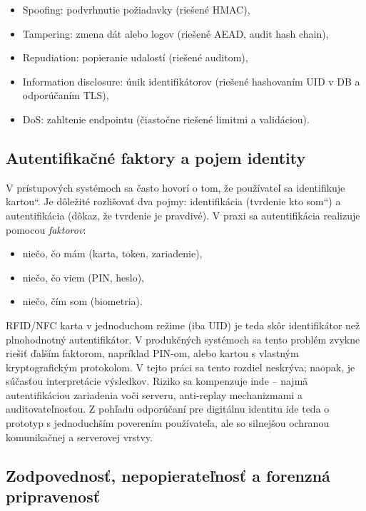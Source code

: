 \documentclass[journal,a4paper,onecolumn]{IEEEtran}
\newcommand{\uv}[1]{\quotedblbase#1\textquotedblleft}
\begin{document}
\begin{itemize}[leftmargin=*,itemsep=2pt]
  \item Spoofing: podvrhnutie požiadavky (riešené HMAC),
  \item Tampering: zmena dát alebo logov (riešené AEAD, audit hash chain),
  \item Repudiation: popieranie udalostí (riešené auditom),
  \item Information disclosure: únik identifikátorov (riešené hashovaním UID v DB a odporúčaním TLS),
  \item DoS: zahltenie endpointu (čiastočne riešené limitmi a validáciou).
\end{itemize}



\subsection{Autentifikačné faktory a pojem identity}

V prístupových systémoch sa často hovorí o tom, že používateľ sa \uv{identifikuje kartou}. Je dôležité rozlišovať dva pojmy: identifikácia (tvrdenie \uv{kto som}) a autentifikácia (dôkaz, že tvrdenie je pravdivé). V praxi sa autentifikácia realizuje pomocou \emph{faktorov}:

\begin{itemize}[leftmargin=*,itemsep=2pt]
  \item niečo, čo mám (karta, token, zariadenie),
  \item niečo, čo viem (PIN, heslo),
  \item niečo, čím som (biometria).
\end{itemize}

RFID/NFC karta v jednoduchom režime (iba UID) je teda skôr identifikátor než plnohodnotný autentifikátor. V produkčných systémoch sa tento problém zvykne riešiť ďalším faktorom, napríklad PIN-om, alebo kartou s vlastným kryptografickým protokolom. V tejto práci sa tento rozdiel neskrýva; naopak, je súčasťou interpretácie výsledkov. Riziko sa kompenzuje inde -- najmä autentifikáciou zariadenia voči serveru, anti-replay mechanizmami a auditovateľnosťou. Z pohľadu odporúčaní pre digitálnu identitu ide teda o prototyp s jednoduchším poverením používateľa, ale so silnejšou ochranou komunikačnej a serverovej vrstvy.\cite{NIST80063B4,FIPS2013}

\subsection{Zodpovednosť, nepopierateľnosť a forenzná pripravenosť}
\end{document}
